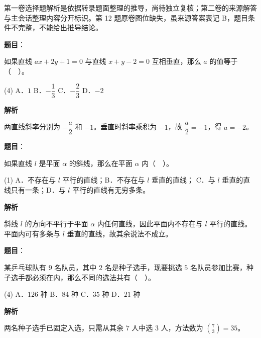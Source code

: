 

\begin{gktip}
第一卷选择题解析是依据转录题面整理的推导，尚待独立复核；第二卷的来源解答与主会话整理内容分开标识。第 12 题原卷图位缺失，虽来源答案表记 B，题目条件不完整，不能给出推导结论。
\end{gktip}

\begin{answer}

\textbf{题目}：

如果直线 $ax+2y+1=0$ 与直线 $x+y-2=0$ 互相垂直，那么 $a$ 的值等于（　）。

\begin{gkopts}(4)
\task A．$1$
\task B．$-\dfrac{1}{3}$
\task C．$-\dfrac{2}{3}$
\task D．$-2$
\end{gkopts}

\textbf{解析}

两直线斜率分别为 $-\dfrac a2$ 和 $-1$。垂直时斜率乘积为 $-1$，故 $\dfrac a2=-1$，得 $a=-2$。


\end{answer}
\begin{answer}

\textbf{题目}：

如果直线 $l$ 是平面 $\alpha$ 的斜线，那么在平面 $\alpha$ 内（　）。

\begin{gkopts}(1)
\task A．不存在与 $l$ 平行的直线；B．不存在与 $l$ 垂直的直线；
\task C．与 $l$ 垂直的直线只有一条；D．与 $l$ 平行的直线有无穷多条。
\end{gkopts}

\textbf{解析}

斜线 $l$ 的方向不平行于平面 $\alpha$ 内任何直线，因此平面内不存在与 $l$ 平行的直线。平面内可有多条与 $l$ 垂直的直线，故其余说法不成立。


\end{answer}
\begin{answer}

\textbf{题目}：

某乒乓球队有 $9$ 名队员，其中 $2$ 名是种子选手，现要挑选 $5$ 名队员参加比赛，种子选手都必须在内，那么不同的选法共有（　）。

\begin{gkopts}(4)
\task A．$126$ 种
\task B．$84$ 种
\task C．$35$ 种
\task D．$21$ 种
\end{gkopts}

\textbf{解析}

两名种子选手已固定入选，只需从其余 $7$ 人中选 $3$ 人，方法数为 $\binom73=35$。


\end{answer}
